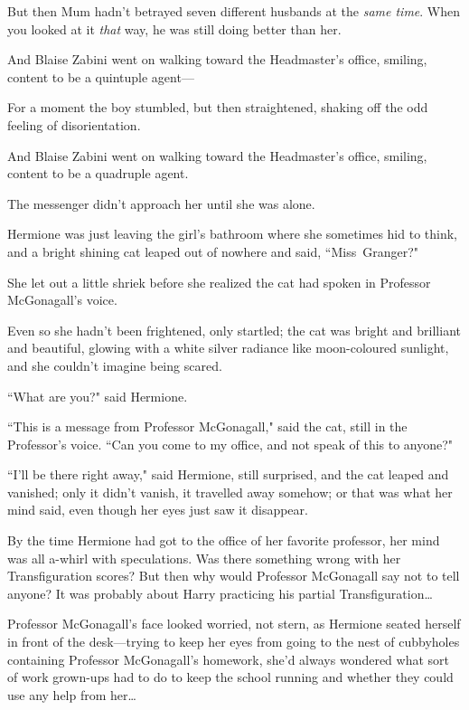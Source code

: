 But then Mum hadn't betrayed seven different husbands at the \emph{same time}. When you looked at it \emph{that} way, he was still doing better than her.

And Blaise Zabini went on walking toward the Headmaster's office, smiling, content to be a quintuple agent—

For a moment the boy stumbled, but then straightened, shaking off the odd feeling of disorientation.

And Blaise Zabini went on walking toward the Headmaster's office, smiling, content to be a quadruple agent.


The messenger didn't approach her until she was alone.

Hermione was just leaving the girl's bathroom where she sometimes hid to think, and a bright shining cat leaped out of nowhere and said, ``Miss~Granger?"

She let out a little shriek before she realized the cat had spoken in Professor McGonagall's voice.

Even so she hadn't been frightened, only startled; the cat was bright and brilliant and beautiful, glowing with a white silver radiance like moon-coloured sunlight, and she couldn't imagine being scared.

``What are you?" said Hermione.

``This is a message from Professor McGonagall," said the cat, still in the Professor's voice. ``Can you come to my office, and not speak of this to anyone?"

``I'll be there right away," said Hermione, still surprised, and the cat leaped and vanished; only it didn't vanish, it travelled away somehow; or that was what her mind said, even though her eyes just saw it disappear.

By the time Hermione had got to the office of her favorite professor, her mind was all a-whirl with speculations. Was there something wrong with her Transfiguration scores? But then why would Professor McGonagall say not to tell anyone? It was probably about Harry practicing his partial Transfiguration{\ldots}

Professor McGonagall's face looked worried, not stern, as Hermione seated herself in front of the desk—trying to keep her eyes from going to the nest of cubbyholes containing Professor McGonagall's homework, she'd always wondered what sort of work grown-ups had to do to keep the school running and whether they could use any help from her{\ldots}

